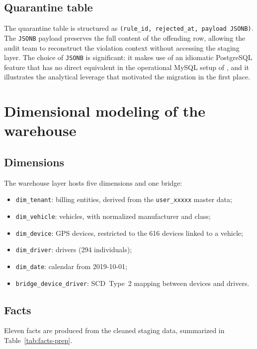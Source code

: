 \subsection{Quarantine table}
The quarantine table is structured as \texttt{(rule\_id, rejected\_at, payload~JSONB)}. The \texttt{JSONB} payload preserves the full content of the offending row, allowing the audit team to reconstruct the violation context without accessing the staging layer. The choice of \texttt{JSONB} is significant: it makes use of an idiomatic PostgreSQL feature that has no direct equivalent in the operational MySQL setup of \hostorg, and it illustrates the analytical leverage that motivated the migration in the first place.

\section{Dimensional modeling of the warehouse}

\subsection{Dimensions}
The warehouse layer hosts five dimensions and one bridge:

\begin{itemize}
    \item \texttt{dim\_tenant}: billing entities, derived from the \texttt{user\_xxxxx} master data;
    \item \texttt{dim\_vehicle}: vehicles, with normalized manufacturer and class;
    \item \texttt{dim\_device}: GPS devices, restricted to the 616 devices linked to a vehicle;
    \item \texttt{dim\_driver}: drivers (294 individuals);
    \item \texttt{dim\_date}: calendar from 2019-10-01;
    \item \texttt{bridge\_device\_driver}: SCD~Type~2 mapping between devices and drivers.
\end{itemize}

\subsection{Facts}
Eleven facts are produced from the cleaned staging data, summarized in Table~\ref{tab:facts-prep}.

